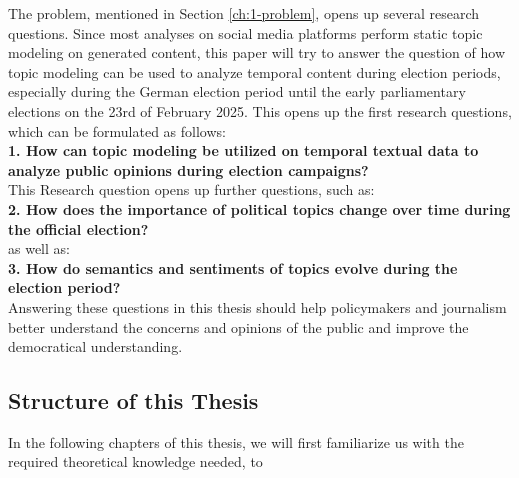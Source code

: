The problem, mentioned in Section \ref{ch:1-problem}, opens up several research questions. Since most analyses on social media platforms perform static topic modeling on generated content, this paper will try to answer the question of how topic modeling can be used to analyze temporal content during election periods, especially during the German election period until the early parliamentary elections on the 23rd of February 2025. This opens up the first research questions, which can be formulated as follows: \\

\textbf{1. How can topic modeling be utilized on temporal textual data to analyze public opinions during election campaigns?}\\

This Research question opens up further questions, such as:\\

\textbf{2. How does the importance of political topics change over time during the official election?}\\

as well as:\\

\textbf{3. How do semantics and sentiments of topics evolve during the election period?}\\

Answering these questions in this thesis should help policymakers and journalism better understand the concerns and opinions of the public and improve the democratical understanding.



\subsection{Structure of this Thesis}

In the following chapters of this thesis, we will first familiarize us with the required theoretical knowledge needed, to 


